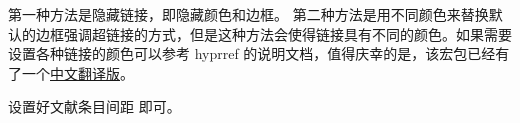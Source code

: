 第一种方法是隐藏链接，即隐藏颜色和边框。
第二种方法是用不同颜色来替换默认的边框强调超链接的方式，但是这种方法会使得链接具有不同的颜色。如果需要设置各种链接的颜色可以参考
hyprref
的说明文档，值得庆幸的是，该宏包已经有了一个\href{https://github.com/latexstudio/LaTeXPackages-CN/blob/master/hyperref/hyperref-zh-cn.pdf}{中文翻译版}。



设置好文献条目间距  即可。






